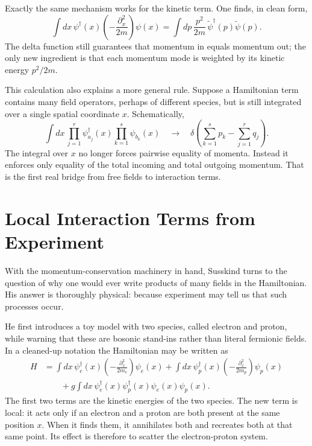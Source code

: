 Exactly the same mechanism works for the kinetic term. One finds, in clean form,
\begin{equation}
\int dx\,\psi^\dagger(x)\left(-\frac{\partial_x^2}{2m}\right)\psi(x)
=
\int dp\,\frac{p^2}{2m}\,\tilde\psi^\dagger(p)\tilde\psi(p).
\end{equation}
The delta function still guarantees that momentum in equals momentum out; the only new ingredient is that each momentum mode is weighted by its kinetic energy \(p^2/2m\).

This calculation also explains a more general rule. Suppose a Hamiltonian term contains many field operators, perhaps of different species, but is still integrated over a single spatial coordinate \(x\). Schematically,
\begin{equation}
\int dx\,
\prod_{j=1}^{r}\psi_{a_j}^\dagger(x)
\prod_{k=1}^{s}\psi_{b_k}(x)
\quad \longrightarrow \quad
\delta\!\left(\sum_{k=1}^{s}p_k-\sum_{j=1}^{r}q_j\right).
\end{equation}
The integral over \(x\) no longer forces pairwise equality of momenta. Instead it enforces only equality of the total incoming and total outgoing momentum. That is the first real bridge from free fields to interaction terms.

\section{Local Interaction Terms from Experiment}

With the momentum-conservation machinery in hand, Susskind turns to the question of why one would ever write products of many fields in the Hamiltonian. His answer is thoroughly physical: because experiment may tell us that such processes occur.

He first introduces a toy model with two species, called electron and proton, while warning that these are bosonic stand-ins rather than literal fermionic fields. In a cleaned-up notation the Hamiltonian may be written as
\begin{align}
H
&=
\int dx\,\psi_e^\dagger(x)\left(-\frac{\partial_x^2}{2m_e}\right)\psi_e(x)
+
\int dx\,\psi_p^\dagger(x)\left(-\frac{\partial_x^2}{2m_p}\right)\psi_p(x)
\nonumber\\
&\qquad
+
g\int dx\,\psi_e^\dagger(x)\psi_p^\dagger(x)\psi_e(x)\psi_p(x).
\end{align}
The first two terms are the kinetic energies of the two species. The new term is local: it acts only if an electron and a proton are both present at the same position \(x\). When it finds them, it annihilates both and recreates both at that same point. Its effect is therefore to scatter the electron-proton system.

